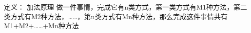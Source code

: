 \documentclass[UTF8]{ctexart}
\begin{document}
\begin{markdown}
定义：
加法原理
做一件事情，完成它有n类方式，第一类方式有M1种方法，第二类方式有M2种方法，……，第n类方式有Mn种方法，那么完成这件事情共有M1+M2+……+Mn种方法
\end{markdown}
\end{document}

